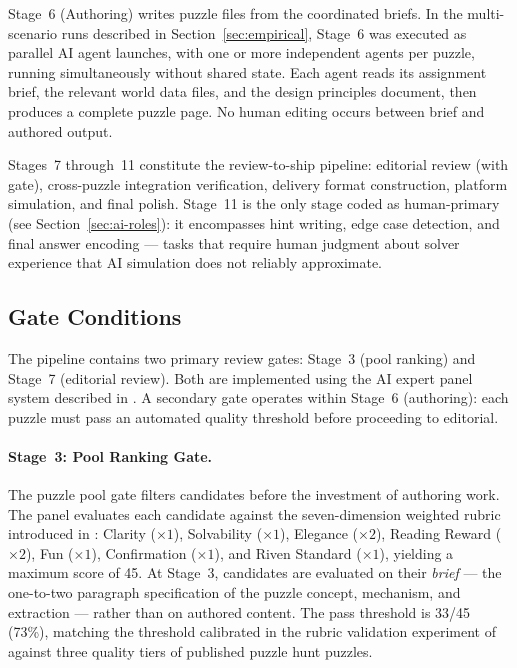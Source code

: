 Stage~6 (Authoring) writes puzzle files from the coordinated briefs. In the
multi-scenario runs described in Section~\ref{sec:empirical}, Stage~6 was executed as
parallel AI agent launches, with one or more independent agents per puzzle, running
simultaneously without shared state. Each agent reads its assignment brief, the relevant
world data files, and the design principles document, then produces a complete puzzle
page. No human editing occurs between brief and authored output.

Stages~7 through~11 constitute the review-to-ship pipeline: editorial review (with gate),
cross-puzzle integration verification, delivery format construction, platform simulation,
and final polish. Stage~11 is the only stage coded as human-primary (see
Section~\ref{sec:ai-roles}): it encompasses hint writing, edge case detection, and final
answer encoding --- tasks that require human judgment about solver experience that AI
simulation does not reliably approximate.

\subsection{Gate Conditions}
\label{sec:gates}

The pipeline contains two primary review gates: Stage~3 (pool ranking) and Stage~7
(editorial review). Both are implemented using the AI expert panel system described
in \cite{dellaLibera2025panel}. A secondary gate operates within Stage~6 (authoring):
each puzzle must pass an automated quality threshold before proceeding to editorial.

\paragraph{Stage~3: Pool Ranking Gate.}

The puzzle pool gate filters candidates before the investment of authoring work. The panel
evaluates each candidate against the seven-dimension weighted rubric introduced in
\cite{dellaLibera2025panel}: Clarity ($\times 1$), Solvability ($\times 1$), Elegance
($\times 2$), Reading Reward ($\times 2$), Fun ($\times 1$), Confirmation ($\times 1$),
and Riven Standard ($\times 1$), yielding a maximum score of 45. At Stage~3, candidates
are evaluated on their \emph{brief} --- the one-to-two paragraph specification of the
puzzle concept, mechanism, and extraction --- rather than on authored content. The pass
threshold is 33/45 (73\%), matching the threshold calibrated in the rubric validation
experiment of \cite{dellaLibera2025panel} against three quality tiers of published puzzle
hunt puzzles.

